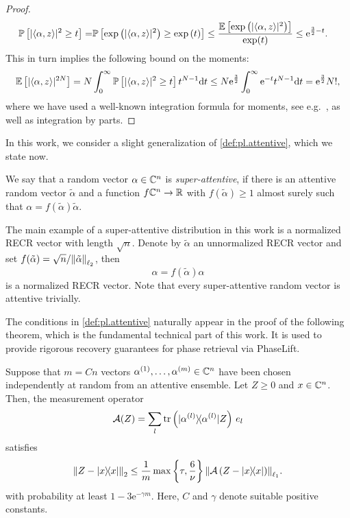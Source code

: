 \begin{proof}
  \begin{align}
    \mathbb{P} \left[ | \langle \alpha, z \rangle|^2 \geq t \right]
    =& \mathbb{P} \left[ \exp \left( | \langle  \alpha, z \rangle|^2 \right) \geq \exp \left( t \right) \right]
    \leq \frac{ \mathbb{E} \left[ \exp \left( | \langle \alpha,  z \rangle|^2 \right) \right]}{\exp (t)} \leq \mathrm{e}^{\frac{3}{2}-t}.
  \end{align}
  This in turn implies the following bound on the moments:
  \begin{align}
    \mathbb{E} \left[ | \langle  \alpha, z \rangle|^{2N} \right]
    =  N \int_0^\infty \mathbb{P}\left[ | \langle  \alpha, z \rangle|^2\geq t \right] t^{N-1} \mathrm{d}t \leq N \mathrm{e}^{\frac{3}{2}} \int_0^\infty \mathrm{e}^{-t} t^{N-1} \mathrm{d}t
    = \mathrm{e}^{\frac{3}{2}} N!,
  \end{align}
  where we have used a well-known integration formula for moments, see e.g.\ \cite[Prop.~7.1]{Foucart_2013_Mathematical}, as well as integration by parts.
\end{proof}

In this work, we consider a slight generalization of \cref{def:pl.attentive}, which we state now.
\begin{definition}%
  \label{def:pl.super_attentitive}
  We say that a random vector $\alpha \in {\mathbb{C}}^n$ is \emph{super-attentive}, if there is an attentive random vector $\tilde\alpha$ and a function $f {\mathbb{C}}^n \to {\mathbb{R}}$ with $f(\tilde\alpha) \ge 1$ almost surely such that $\alpha = f(\tilde\alpha) \tilde \alpha$.
\end{definition}
The main example of a super-attentive distribution in this work is a normalized RECR vector with length $\sqrt{n}$.
Denote by $\tilde\alpha$ an unnormalized RECR vector and set $f(\tilde\alpha) = \sqrt{n} / {\Vert\tilde\alpha\Vert}_{\ell_2}$, then
\[
  \alpha = f(\tilde\alpha) \alpha
  \label{eq:pl.normalized_recr}
\]
is a normalized RECR vector.
Note that every super-attentive random vector is attentive trivially.

The conditions in \cref{def:pl.attentive} naturally appear in the proof of the following theorem, which is the fundamental technical part of this work.
It is used to provide rigorous recovery guarantees for phase retrieval via PhaseLift.

\begin{proposition}%
  \label{prop:pl.nsp}
  Suppose that $m = Cn$ vectors $\alpha^{(1)},\ldots,\alpha^{(m)} \in \mathbb{C}^n$ have been chosen independently at random from an attentive ensemble.
  Let $Z\geq 0$ and $x \in {\mathbb{C}}^n$.
  Then, the measurement operator
  \[
    \label{eq:pl.measurement_operator_rank1}
    \mathcal{A}(Z) = \sum_l \tr \left(\ketbra{\alpha\ind{l}}  Z\right) \, {e_l}
  \]
  satisfies
  \[
    \label{eq:pl.rec_guarantee_nsp}
    \Fnorm{Z - \ketbra{x}}
    \leq \frac{1}{m} \max \left\{ \tau, \frac{6}{\nu} \right\}  \Norm{\mathcal{A}\left( Z - \ketbra{x} \right)}_{\ell_1}.
  \]
  with probability at least $1- 3\mathrm{e}^{-\gamma m}$.
  Here, $C$ and $\gamma$ denote suitable positive constants.
\end{proposition}

